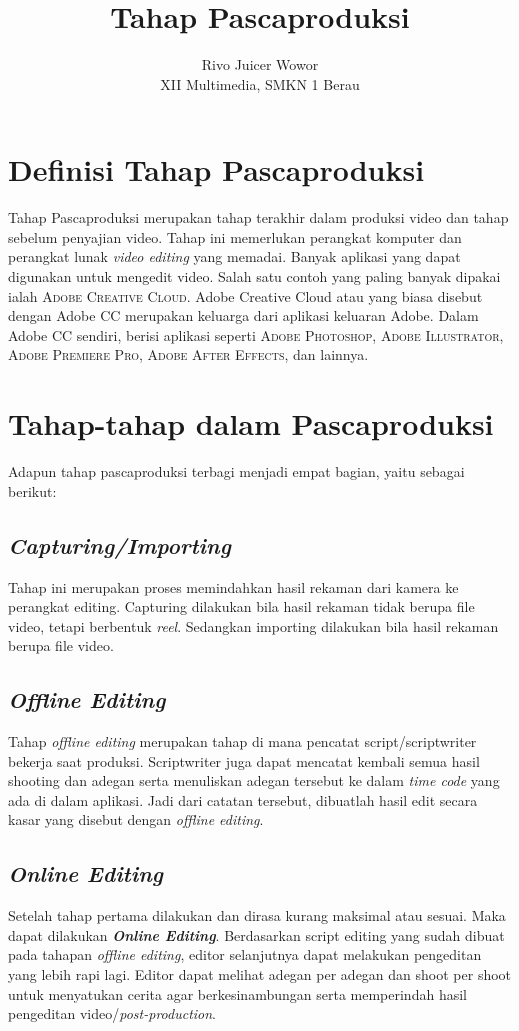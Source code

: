 \documentclass[12pt]{article}
\title{\textbf{Tahap Pascaproduksi}}
\author{Rivo Juicer Wowor\\ XII Multimedia, SMKN 1 Berau}
\date{}
\begin{document}
    \maketitle
    
    \section{Definisi Tahap Pascaproduksi}
    Tahap Pascaproduksi merupakan tahap terakhir dalam produksi video dan tahap sebelum penyajian video. Tahap ini memerlukan perangkat komputer dan perangkat lunak \textit{video editing} yang memadai. Banyak aplikasi yang dapat digunakan untuk mengedit video. Salah satu contoh yang paling banyak dipakai ialah \textsc{Adobe Creative Cloud.} Adobe Creative Cloud atau yang biasa disebut dengan Adobe CC merupakan keluarga dari aplikasi keluaran Adobe. Dalam Adobe CC sendiri, berisi aplikasi seperti \textsc{Adobe Photoshop, Adobe Illustrator, Adobe Premiere Pro, Adobe After Effects,} dan lainnya.

    \section{Tahap-tahap dalam Pascaproduksi}
    Adapun tahap pascaproduksi terbagi menjadi empat bagian, yaitu sebagai berikut:
    
    \subsection{\textit{Capturing/Importing}}
    Tahap ini merupakan proses memindahkan hasil rekaman dari kamera ke perangkat editing. Capturing dilakukan bila hasil rekaman tidak berupa file video, tetapi berbentuk \textit{reel}. Sedangkan importing dilakukan bila hasil rekaman berupa file video.

    \subsection{\textit{Offline Editing}}
    Tahap \textit{offline editing} merupakan tahap di mana pencatat script/scriptwriter bekerja saat produksi. Scriptwriter juga dapat mencatat kembali semua hasil shooting dan adegan serta menuliskan adegan tersebut ke dalam \textit{time code} yang ada di dalam aplikasi. Jadi dari catatan tersebut, dibuatlah hasil edit secara kasar yang disebut dengan \textit{offline editing}.
    
    \subsection{\textit{Online Editing}}
    Setelah tahap pertama dilakukan dan dirasa kurang maksimal atau sesuai. Maka dapat dilakukan \textit{\textbf{Online Editing}}. Berdasarkan script editing yang sudah dibuat pada tahapan \textit{offline editing}, editor selanjutnya dapat melakukan pengeditan yang lebih rapi lagi. Editor dapat melihat adegan per adegan dan shoot per shoot untuk menyatukan cerita agar berkesinambungan serta memperindah hasil pengeditan video/\textit{post-production}.
\end{document}
